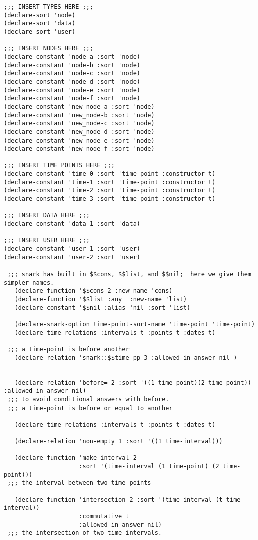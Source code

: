\begin{lstlisting}
;;; INSERT TYPES HERE ;;;
(declare-sort 'node)
(declare-sort 'data)
(declare-sort 'user)

;;; INSERT NODES HERE ;;;
(declare-constant 'node-a :sort 'node)
(declare-constant 'node-b :sort 'node)
(declare-constant 'node-c :sort 'node)
(declare-constant 'node-d :sort 'node)
(declare-constant 'node-e :sort 'node)
(declare-constant 'node-f :sort 'node)
(declare-constant 'new_node-a :sort 'node)
(declare-constant 'new_node-b :sort 'node)
(declare-constant 'new_node-c :sort 'node)
(declare-constant 'new_node-d :sort 'node)
(declare-constant 'new_node-e :sort 'node)
(declare-constant 'new_node-f :sort 'node)

;;; INSERT TIME POINTS HERE ;;;
(declare-constant 'time-0 :sort 'time-point :constructor t)
(declare-constant 'time-1 :sort 'time-point :constructor t)
(declare-constant 'time-2 :sort 'time-point :constructor t)
(declare-constant 'time-3 :sort 'time-point :constructor t)

;;; INSERT DATA HERE ;;;
(declare-constant 'data-1 :sort 'data)

;;; INSERT USER HERE ;;;
(declare-constant 'user-1 :sort 'user)
(declare-constant 'user-2 :sort 'user)
  
 ;;; snark has built in $$cons, $$list, and $$nil;  here we give them simpler names.
   (declare-function '$$cons 2 :new-name 'cons)
   (declare-function '$$list :any  :new-name 'list)
   (declare-constant '$$nil :alias 'nil :sort 'list)

   (declare-snark-option time-point-sort-name 'time-point 'time-point)
   (declare-time-relations :intervals t :points t :dates t)

 ;;; a time-point is before another
   (declare-relation 'snark::$$time-pp 3 :allowed-in-answer nil )


   (declare-relation 'before= 2 :sort '((1 time-point)(2 time-point)) :allowed-in-answer nil)    
 ;;; to avoid conditional answers with before.
 ;;; a time-point is before or equal to another

   (declare-time-relations :intervals t :points t :dates t)

   (declare-relation 'non-empty 1 :sort '((1 time-interval)))

   (declare-function 'make-interval 2
                     :sort '(time-interval (1 time-point) (2 time-point)))
 ;;; the interval between two time-points

   (declare-function 'intersection 2 :sort '(time-interval (t time-interval))
                     :commutative t
                     :allowed-in-answer nil)
 ;;; the intersection of two time intervals.


\end{lstlisting}
